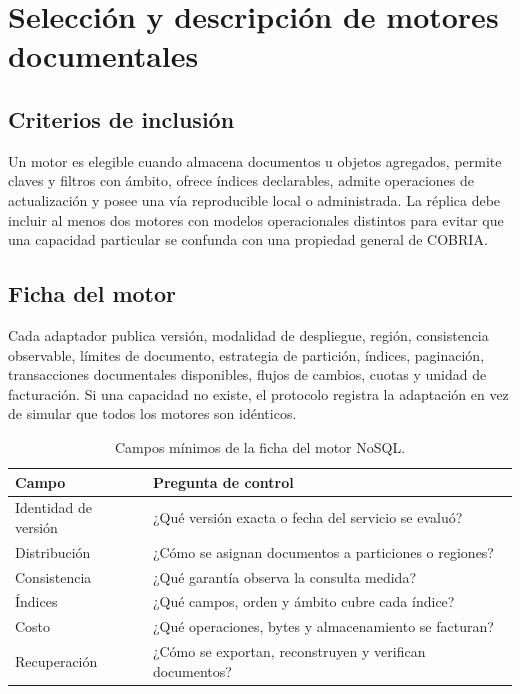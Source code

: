 \chapter{Selección y descripción de motores documentales}

\section{Criterios de inclusión}

Un motor es elegible cuando almacena documentos u objetos agregados, permite claves y
filtros con ámbito, ofrece índices declarables, admite operaciones de actualización y
posee una vía reproducible local o administrada. La réplica debe incluir al menos dos
motores con modelos operacionales distintos para evitar que una capacidad particular se
confunda con una propiedad general de COBRIA.

\section{Ficha del motor}

Cada adaptador publica versión, modalidad de despliegue, región, consistencia observable,
límites de documento, estrategia de partición, índices, paginación, transacciones
documentales disponibles, flujos de cambios, cuotas y unidad de facturación. Si una
capacidad no existe, el protocolo registra la adaptación en vez de simular que todos los
motores son idénticos.

\begin{table}[H]\centering
\caption{Campos mínimos de la ficha del motor NoSQL.}
\begin{tabularx}{\textwidth}{p{4cm}X}\toprule
Campo & Pregunta de control\\\midrule
Identidad de versión & ¿Qué versión exacta o fecha del servicio se evaluó?\\
Distribución & ¿Cómo se asignan documentos a particiones o regiones?\\
Consistencia & ¿Qué garantía observa la consulta medida?\\
Índices & ¿Qué campos, orden y ámbito cubre cada índice?\\
Costo & ¿Qué operaciones, bytes y almacenamiento se facturan?\\
Recuperación & ¿Cómo se exportan, reconstruyen y verifican documentos?\\
\bottomrule\end{tabularx}\end{table}


